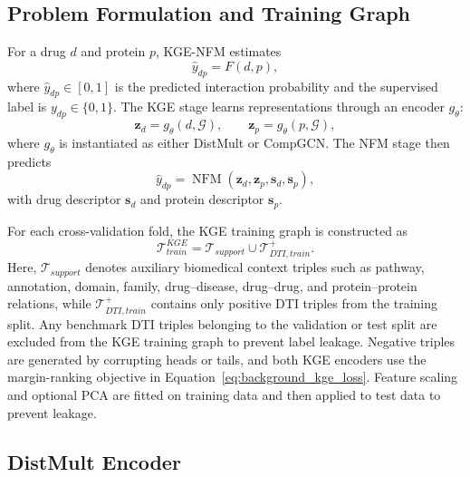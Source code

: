 \subsection{Problem Formulation and Training Graph}

For a drug $d$ and protein $p$, KGE-NFM estimates
\begin{equation}
    \hat{y}_{dp}=F(d,p),
\end{equation}
where $\hat{y}_{dp}\in[0,1]$ is the predicted interaction probability and the supervised label is $y_{dp}\in\{0,1\}$. The KGE stage learns representations through an encoder $g_{\theta}$:
\begin{equation}
    \mathbf{z}_{d}=g_{\theta}(d,\mathcal{G}),
    \qquad
    \mathbf{z}_{p}=g_{\theta}(p,\mathcal{G}),
\end{equation}
where $g_{\theta}$ is instantiated as either DistMult or CompGCN. The NFM stage then predicts
\begin{equation}
    \hat{y}_{dp}
    =
    \operatorname{NFM}
    \left(
        \mathbf{z}_{d},
        \mathbf{z}_{p},
        \mathbf{s}_{d},
        \mathbf{s}_{p}
    \right),
\end{equation}
with drug descriptor $\mathbf{s}_{d}$ and protein descriptor $\mathbf{s}_{p}$.

For each cross-validation fold, the KGE training graph is constructed as
\begin{equation}
    \mathcal{T}_{train}^{KGE}
    =
    \mathcal{T}_{support}
    \cup
    \mathcal{T}_{DTI,train}^{+}.
    \label{eq:kge_training_graph}
\end{equation}
Here, $\mathcal{T}_{support}$ denotes auxiliary biomedical context triples such as pathway, annotation, domain, family, drug--disease, drug--drug, and protein--protein relations, while $\mathcal{T}_{DTI,train}^{+}$ contains only positive DTI triples from the training split. Any benchmark DTI triples belonging to the validation or test split are excluded from the KGE training graph to prevent label leakage. Negative triples are generated by corrupting heads or tails, and both KGE encoders use the margin-ranking objective in Equation~\ref{eq:background_kge_loss}. Feature scaling and optional PCA are fitted on training data and then applied to test data to prevent leakage.

\subsection{DistMult Encoder}

